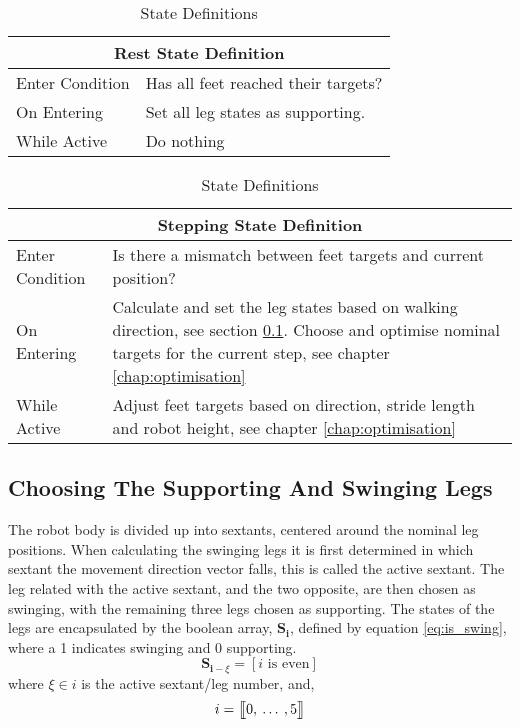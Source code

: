\begin{table}[h]
    \center
    \begin{tabularx}{\textwidth}{|l|X|}
        \hline
        \multicolumn{2}{|c|}{Rest State Definition} \\
        \hline
        Enter Condition & Has all feet reached their targets? \\
        \hline
        On Entering & Set all leg states as supporting. \\
        \hline
        While Active & Do nothing \\
        \hline
    \end{tabularx}
    
    \bigskip
    \noindent
    \begin{tabularx}{\textwidth}{|l|X|}
        \hline
        \multicolumn{2}{|c|}{Stepping State Definition} \\
        \hline
        Enter Condition & Is there a mismatch between feet targets and current position? \\
        \hline
        On Entering & Calculate and set the leg states based on walking direction, see section \ref{sec:supp_swing_calc}. Choose and optimise nominal targets
        for the current step, see chapter \ref{chap:optimisation}\\
        \hline
        While Active & Adjust feet targets based on direction, stride length and robot height, see chapter \ref{chap:optimisation}\\
        \hline
    \end{tabularx}
    \caption{State Definitions}
    \label{tab:state_defs}
\end{table}

\newpage
\subsection{Choosing The Supporting And Swinging Legs} \label{sec:supp_swing_calc}
    The robot body is divided up into sextants, centered around the nominal leg positions. When calculating
    the swinging legs it is first determined in which sextant the movement direction vector falls, this is called the active sextant.
    The leg related with the active sextant, and the two opposite, are then chosen as swinging, with the remaining three legs chosen as supporting.
    The states of the legs are encapsulated by the boolean array, \(\bm{S_i}\), defined by equation \ref{eq:is_swing},
    where a 1 indicates swinging and 0 supporting.
    \begin{equation}\label{eq:is_swing}
        \bm{S}_{\bm{i} - \xi}=[i \text{ is even}]
    \end{equation}
    where \(\xi \in i\) is the active sextant/leg number, and,
    \[i = \seq{0}{1}{5}\]


